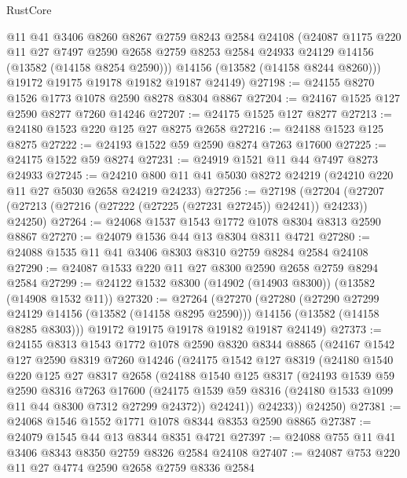 \begin{lexlean}{RustCore}
\begin{coremodule}
        @11
        @41
        @3406
        @8260
        @8267
        @2759
        @8243
        @2584
        @24108
        (@24087
          @1175
          @220
          @11
          @27
          @7497
          @2590
          @2658
          @2759
          @8253
          @2584
          @24933
          @24129
          @14156
          (@13582 (@14158 @8254 @2590)))
        @14156
        (@13582 (@14158 @8244 @8260)))
      @19172
      @19175
      @19178
      @19182
      @19187
      @24149)
@27198 := @24155 @8270 @1526 @1773 @1078 @2590 @8278 @8304 @8867
@27204 := @24167 @1525 @127 @2590 @8277 @7260 @14246
@27207 := @24175 @1525 @127 @8277
@27213 := @24180 @1523 @220 @125 @27 @8275 @2658
@27216 := @24188 @1523 @125 @8275
@27222 := @24193 @1522 @59 @2590 @8274 @7263 @17600
@27225 := @24175 @1522 @59 @8274
@27231 := @24919 @1521 @11 @44 @7497 @8273 @24933
@27245 := @24210 @800 @11 @41 @5030 @8272 @24219 (@24210 @220 @11 @27 @5030 @2658 @24219 @24233)
@27256 := @27198
    (@27204 (@27207 (@27213 (@27216 (@27222 (@27225 (@27231 @27245)) @24241)) @24233)) @24250)
@27264 := @24068 @1537 @1543 @1772 @1078 @8304 @8313 @2590 @8867
@27270 := @24079 @1536 @44 @13 @8304 @8311 @4721
@27280 := @24088 @1535 @11 @41 @3406 @8303 @8310 @2759 @8284 @2584 @24108
@27290 := @24087 @1533 @220 @11 @27 @8300 @2590 @2658 @2759 @8294 @2584
@27299 := @24122 @1532 @8300 (@14902 (@14903 @8300)) (@13582 (@14908 @1532 @11))
@27320 := @27264
    (@27270
      (@27280
        (@27290 @27299 @24129 @14156 (@13582 (@14158 @8295 @2590)))
        @14156
        (@13582 (@14158 @8285 @8303)))
      @19172
      @19175
      @19178
      @19182
      @19187
      @24149)
@27373 := @24155
    @8313
    @1543
    @1772
    @1078
    @2590
    @8320
    @8344
    @8865
    (@24167
      @1542
      @127
      @2590
      @8319
      @7260
      @14246
      (@24175
        @1542
        @127
        @8319
        (@24180
          @1540
          @220
          @125
          @27
          @8317
          @2658
          (@24188
            @1540
            @125
            @8317
            (@24193
              @1539
              @59
              @2590
              @8316
              @7263
              @17600
              (@24175 @1539 @59 @8316 (@24180 @1533 @1099 @11 @44 @8300 @7312 @27299 @24372))
              @24241))
          @24233))
      @24250)
@27381 := @24068 @1546 @1552 @1771 @1078 @8344 @8353 @2590 @8865
@27387 := @24079 @1545 @44 @13 @8344 @8351 @4721
@27397 := @24088 @755 @11 @41 @3406 @8343 @8350 @2759 @8326 @2584 @24108
@27407 := @24087 @753 @220 @11 @27 @4774 @2590 @2658 @2759 @8336 @2584

\end{coremodule}
\end{lexlean}
